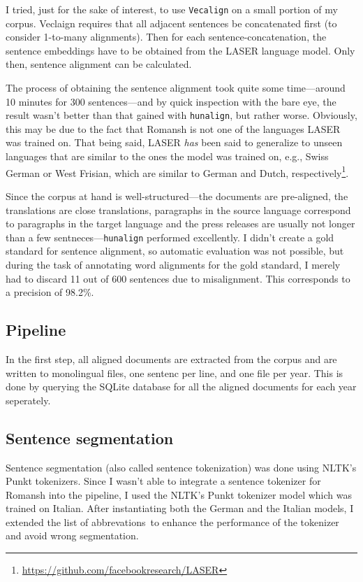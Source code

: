 I tried, just for the sake of interest, to use \texttt{Vecalign} on a small portion of my corpus. 
Veclaign requires that all adjacent sentences be concatenated first (to consider 1-to-many alignments). 
Then for each sentence-concatenation, the sentence embeddings have to be obtained from the LASER language model. 
Only then, sentence alignment can be calculated. 

The process of obtaining the sentence alignment took quite some time---around 10 minutes for 300 sentences---and by quick inspection with the bare eye, the result wasn't better than that gained with \texttt{hunalign}, but rather worse. 
Obviously, this may be due to the fact that Romansh is not one of the languages LASER was trained on. 
That being said, LASER \emph{has} been said to generalize to unseen languages that are similar to the ones the model was trained on, e.g., Swiss German or West Frisian, which are similar to German and Dutch, respectively\footnote{\url{https://github.com/facebookresearch/LASER}}.

Since the corpus at hand is well-structured---the documents are pre-aligned, the translations are close translations, paragraphs in the source language correspond to paragraphs in the target language and the press releases are usually not longer than a few sentneces---\texttt{hunalign} performed excellently. 
I didn't create a gold standard for sentence alignment, so automatic evaluation was not possible, but during the task of annotating word alignments for the gold standard, I merely had to discard 11 out of 600 sentences due to  misalignment. 
This corresponds to a precision of 98.2\%.

\subsection{Pipeline}
In the first step, all aligned documents are extracted from the corpus and are written to monolingual files, one sentenc per line, and one file per year.
This is done by querying the SQLite database for all the aligned documents for each year seperately. 

\subsection{Sentence segmentation}
Sentence segmentation (also called sentence tokenization) was done using NLTK's Punkt tokenizers. 
Since I wasn't able to integrate a sentence tokenizer for Romansh into the pipeline, I used the NLTK's Punkt tokenizer model which was trained on Italian. 
After instantiating both the German and the Italian models, I extended the list of abbrevations\footnotemark~to enhance the performance of the tokenizer and avoid wrong segmentation. 

